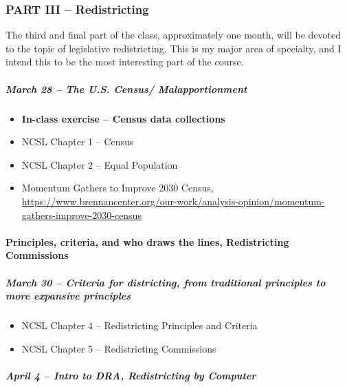 \documentclass[
]{article}
\providecommand{\tightlist}{%
  \setlength{\itemsep}{0pt}\setlength{\parskip}{0pt}}
\begin{document}
\hypertarget{part-iii-redistricting}{%
\subsubsection{PART III -- Redistricting}\label{part-iii-redistricting}}

The third and final part of the class, approximately one month, will be
devoted to the topic of legislative redistricting. This is my major area
of specialty, and I intend this to be the most interesting part of the
course.

\hypertarget{march-28-the-u.s.-census-malapportionment}{%
\subparagraph{March 28 -- The U.S. Census/
Malapportionment}\label{march-28-the-u.s.-census-malapportionment}}

\begin{itemize}
\tightlist
\item
  \textbf{In-class exercise -- Census data collections}
\item
  NCSL Chapter 1 -- Census
\item
  NCSL Chapter 2 -- Equal Population
\item
  Momentum Gathers to Improve 2030 Census,
  \url{https://www.brennancenter.org/our-work/analysis-opinion/momentum-gathers-improve-2030-census}
\end{itemize}

\hypertarget{principles-criteria-and-who-draws-the-lines-redistricting-commissions}{%
\paragraph{Principles, criteria, and who draws the lines, Redistricting
Commissions}\label{principles-criteria-and-who-draws-the-lines-redistricting-commissions}}

\hypertarget{march-30-criteria-for-districting-from-traditional-principles-to-more-expansive-principles}{%
\subparagraph{March 30 -- Criteria for districting, from traditional
principles to more expansive
principles}\label{march-30-criteria-for-districting-from-traditional-principles-to-more-expansive-principles}}

\begin{itemize}
\tightlist
\item
  NCSL Chapter 4 -- Redistricting Principles and Criteria
\item
  NCSL Chapter 5 -- Redistricting Commissions
\end{itemize}

\hypertarget{april-4-intro-to-dra-redistricting-by-computer}{%
\subparagraph{April 4 -- Intro to DRA, Redistricting by
Computer}\label{april-4-intro-to-dra-redistricting-by-computer}}
\end{document}
